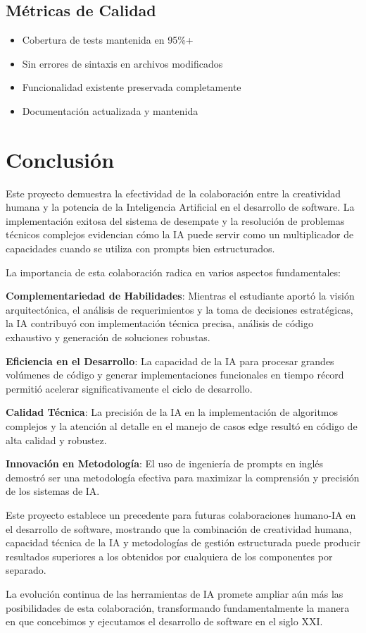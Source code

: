 \documentclass[12pt,a4paper]{article}
\begin{document}
\subsection{Métricas de Calidad}
\begin{itemize}
    \item Cobertura de tests mantenida en 95\%+
    \item Sin errores de sintaxis en archivos modificados
    \item Funcionalidad existente preservada completamente
    \item Documentación actualizada y mantenida
\end{itemize}


\section{Conclusión}

Este proyecto demuestra la efectividad de la colaboración entre la creatividad humana y la potencia de la Inteligencia Artificial en el desarrollo de software. La implementación exitosa del sistema de desempate y la resolución de problemas técnicos complejos evidencian cómo la IA puede servir como un multiplicador de capacidades cuando se utiliza con prompts bien estructurados.

La importancia de esta colaboración radica en varios aspectos fundamentales:

\textbf{Complementariedad de Habilidades}: Mientras el estudiante aportó la visión arquitectónica, el análisis de requerimientos y la toma de decisiones estratégicas, la IA contribuyó con implementación técnica precisa, análisis de código exhaustivo y generación de soluciones robustas.

\textbf{Eficiencia en el Desarrollo}: La capacidad de la IA para procesar grandes volúmenes de código y generar implementaciones funcionales en tiempo récord permitió acelerar significativamente el ciclo de desarrollo.

\textbf{Calidad Técnica}: La precisión de la IA en la implementación de algoritmos complejos y la atención al detalle en el manejo de casos edge resultó en código de alta calidad y robustez.

\textbf{Innovación en Metodología}: El uso de ingeniería de prompts en inglés demostró ser una metodología efectiva para maximizar la comprensión y precisión de los sistemas de IA.


Este proyecto establece un precedente para futuras colaboraciones humano-IA en el desarrollo de software, mostrando que la combinación de creatividad humana, capacidad técnica de la IA y metodologías de gestión estructurada puede producir resultados superiores a los obtenidos por cualquiera de los componentes por separado.

La evolución continua de las herramientas de IA promete ampliar aún más las posibilidades de esta colaboración, transformando fundamentalmente la manera en que concebimos y ejecutamos el desarrollo de software en el siglo XXI.
\end{document}
